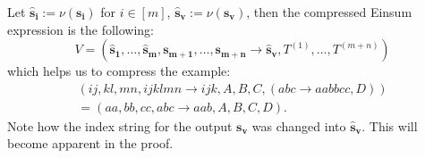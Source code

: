\begin{theorem}
    Let $\bm{\hat{s}_i} := \nu(\bm{s_i})$ for $i \in [m]$, $\bm{\hat{s}_v} := \nu(\bm{s_v})$, then the compressed Einsum expression is the following:
    $$V = (\bm{\hat{s}_1},\dots,\bm{\hat{s}_m}, \bm{s_{m + 1}}, \dots, \bm{s_{m + n}} \rightarrow \bm{\hat{s}_v}, T^{(1)},\dots,T^{(m + n)})$$
    which helps us to compress the example:
    \begin{gather*}
        (ij, kl, mn, ijklmn \rightarrow ijk, A, B, C, (abc \rightarrow aabbcc, D))\\
        = (aa, bb, cc, abc \rightarrow aab, A, B, C, D).
    \end{gather*}
    Note how the index string for the output $\bm{s_v}$ was changed into $\bm{\hat{s}_v}$.
    This will become apparent in the proof.
\end{theorem}

